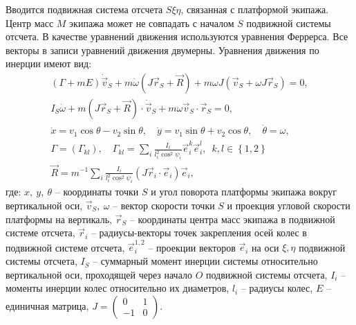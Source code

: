 Вводится подвижная система отсчета $S\xi\eta$, связанная с платформой экипажа. Центр масс $M$ экипажа может не совпадать с началом $S$ подвижной системы отсчета. В качестве уравнений движения используются уравнения Феррерса. Все векторы в записи уравнений движения двумерны. Уравнения движения по инерции имеют вид:
\begin{eqnarray}\label{eq:bor}
    (\Gamma+mE)\dot{\vec{v}}_S + m\dot{\omega}(J\vec{r}_S+\vec{R})+m\omega J(\vec{v}_S + \omega J\vec{r}_S) = 0,\\
    I_S\dot{\omega} + m(J\vec{r}_S+\vec{R})\cdot\dot{\vec{v}}_S+m\omega\vec{v}_S\cdot\vec{r}_S = 0,\\
    \dot{x} = v_1\cos\theta - v_2\sin\theta, \quad \dot{y} = v_1\sin\theta + v_2\cos\theta, \quad \dot{\theta} = \omega,\\
    \Gamma = \left( \Gamma_{kl} \right), \quad \Gamma_{kl} = \sum_i \frac{I_i}{l_i^2 \cos^2\psi_i}\vec{e}_i^k\vec{e}_i^l, \enspace k,l \in \left\{ 1, 2 \right\} \\
    \vec{R} = m^{-1}\sum_i \frac{I_i}{l_i^2 \cos^2\psi_i}(J\vec{r}_i\cdot \vec{e}_i) \vec{e}_i,
\end{eqnarray}
где: \newline
$x, \ y, \ \theta$ -- координаты точки $S$ и угол поворота платформы экипажа вокруг вертикальной оси,\newline
$\vec{v}_S, \ \omega$ -- вектор скорости точки $S$ и проекция угловой скорости платформы на вертикаль,\newline
$\vec{r}_S$ -- координаты центра масс экипажа в подвижной системе отсчета,\newline
$\vec{r}_i$ -- радиусы-векторы точек закрепления осей колес в подвижной системе отсчета,\newline
$\vec{e}_i^{1,2}$ -- проекции векторов $\vec{e}_i$ на оси $\xi,\eta$ подвижной системы отсчета,\newline
$I_S$ -- суммарный момент инерции системы относительно вертикальной оси, проходящей через начало $O$ подвижной системы отсчета,\newline
$I_i$ -- моменты инерции колес относительно их диаметров,\newline
$l_i$ -- радиусы колес,\newline
$E$ -- единичная матрица,
$J = \left(\begin{array}{cc}0 & 1\\-1 & 0\end{array}\right)$.

